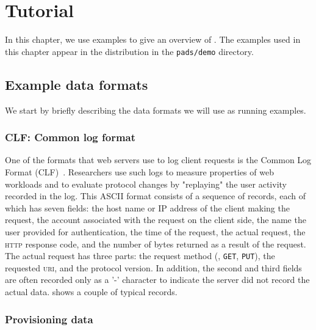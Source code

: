\chapter{Tutorial}
\label{chap:example}
In this chapter, we use examples to give an overview of \pads{}.
The examples used in this chapter appear in the \pads{} distribution in the 
\texttt{pads/demo} directory.


\section{Example data formats}
We start by briefly describing the data formats we will use as running examples. 

\subsection{CLF: Common log format}
\label{sec:example:common-log-format}
One of the formats that web servers use to log client
requests is the Common Log Format (CLF)~\cite{wpp}.  Researchers use such logs to measure 
properties of web workloads and to evaluate protocol changes
by "replaying" the user activity recorded in the log.
This ASCII format consists of a sequence of
records, each of which has seven fields: the host name or IP address
of the client making the request, the account associated with the
request on the client side, the name the user provided for
authentication, the time of the request, the actual request, the
\textsc{http} response code, and the number of bytes returned as a
result of the request.  The actual request has three parts: the
request method (\eg, \texttt{GET}, \texttt{PUT}), the requested
\textsc{uri}, and the protocol version.  In addition, the second and
third fields are often recorded only as a '-' character to indicate
the server did not record the actual data.  
shows a couple of typical records.

\subsection{Provisioning data}

